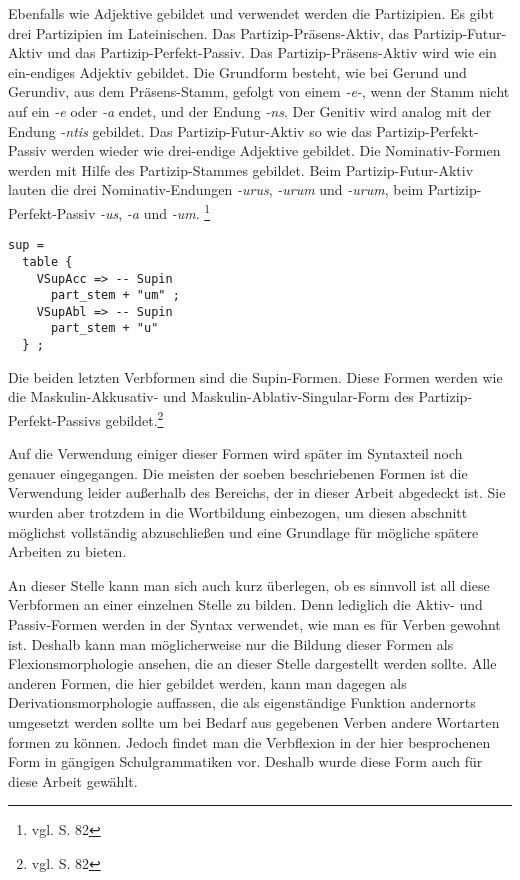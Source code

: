 Ebenfalls wie Adjektive gebildet und verwendet werden die Partizipien. Es gibt drei Partizipien im Lateinischen. Das Partizip-Präsens-Aktiv, das Partizip-Futur-Aktiv und das Partizip-Perfekt-Passiv. Das Partizip-Präsens-Aktiv wird wie ein ein-endiges Adjektiv gebildet. Die Grundform besteht, wie bei Gerund und Gerundiv, aus dem Präsens-Stamm, gefolgt von einem \textit{-e-}, wenn der Stamm nicht auf ein \textit{-e} oder \textit{-a} endet, und der Endung \textit{-ns}. Der Genitiv wird analog mit der Endung \textit{-ntis} gebildet. Das Partizip-Futur-Aktiv so wie das Partizip-Perfekt-Passiv werden wieder wie drei-endige Adjektive gebildet. Die Nominativ-Formen werden mit Hilfe des Partizip-Stammes gebildet. Beim Partizip-Futur-Aktiv lauten die drei Nominativ-Endungen \textit{-urus}, \textit{-urum} und \textit{-urum}, beim Partizip-Perfekt-Passiv \textit{-us}, \textit{-a} und \textit{-um}. \footnote{vgl. \cite{BAYER-LINDAUER1994} S. 82} \par
\begin{lstlisting}[float=h!tp,caption={Ausschnitt aus der Funktion \texttt{mkVerb} um Supin-Verbformen zu bilden (vgl. \textbf{ResLat.gf})},label={GF-Res-MkVerb-Sup},basicstyle=\small]
sup = 
  table {
    VSupAcc => -- Supin
      part_stem + "um" ;
    VSupAbl => -- Supin
      part_stem + "u" 
  } ;
\end{lstlisting}
Die beiden letzten Verbformen sind die Supin-Formen. Diese Formen werden wie die Maskulin-Akkusativ- und Maskulin-Ablativ-Singular-Form des Partizip-Perfekt-Passivs gebildet.\footnote{vgl. \cite{BAYER-LINDAUER1994} S. 82} \par
Auf die Verwendung einiger dieser Formen wird später im Syntaxteil noch genauer eingegangen. Die meisten der soeben beschriebenen Formen ist die Verwendung leider außerhalb des Bereichs, der in dieser Arbeit abgedeckt ist. Sie wurden aber trotzdem in die Wortbildung einbezogen, um diesen abschnitt möglichst vollständig abzuschließen und eine Grundlage für mögliche spätere Arbeiten zu bieten. \par
An dieser Stelle kann man sich auch kurz überlegen, ob es sinnvoll ist all diese Verbformen an einer einzelnen Stelle zu bilden. Denn lediglich die Aktiv- und Passiv-Formen werden in der Syntax verwendet, wie man es für Verben gewohnt ist. Deshalb kann man möglicherweise nur die Bildung dieser Formen als Flexionsmorphologie ansehen, die an dieser Stelle dargestellt werden sollte. Alle anderen Formen, die hier gebildet werden, kann man dagegen als Derivationsmorphologie auffassen, die als eigenständige Funktion andernorts umgesetzt werden sollte um bei Bedarf aus gegebenen Verben andere Wortarten formen zu können. Jedoch findet man die Verbflexion in der hier besprochenen Form in gängigen Schulgrammatiken vor. Deshalb wurde diese Form auch für diese Arbeit gewählt. %
\FloatBarrier

